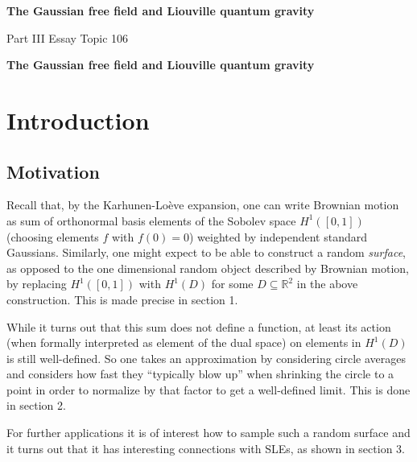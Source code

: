 \documentclass[11pt,reqno]{amsart}
\numberwithin{equation}{section}
\begin{document}
\begin{titlepage}
    \begin{center}
        \vspace*{1cm}
        
        \textbf{The Gaussian free field and Liouville quantum gravity}
        
        \vspace{0.5cm}
        Part III Essay Topic 106
        
        \vspace{1.5cm}
                	
    \end{center}
\end{titlepage}
\begin{center}\textbf{The Gaussian free field and Liouville quantum gravity}\end{center}
\tableofcontents

\section*{Introduction}
\subsection*{Motivation}

Recall that, by the Karhunen-Lo\`eve expansion, one can write Brownian motion as sum of orthonormal basis elements of the Sobolev space $H^1([0,1])$ (choosing elements $f$ with $f(0)=0$) weighted by independent standard Gaussians. Similarly, one might expect to be able to construct a random \emph{surface}, as opposed to the one dimensional random object described by Brownian motion, by replacing $H^1([0,1])$ with $H^1(D)$ for some $D\subseteq\mathbb R^2$ in the above construction. This is made precise in section 1.

While it turns out that this sum does not define a function, at least its action (when formally interpreted as element of the dual space) on elements in $H^1(D)$ is still well-defined. So one takes an approximation by considering circle averages and considers how fast they ``typically blow up'' when shrinking the circle to a point in order to normalize by that factor to get a well-defined limit. This is done in section 2.

For further applications it is of interest how to sample such a random surface and it turns out that it has interesting connections with SLEs, as shown in section 3.
\end{document}
